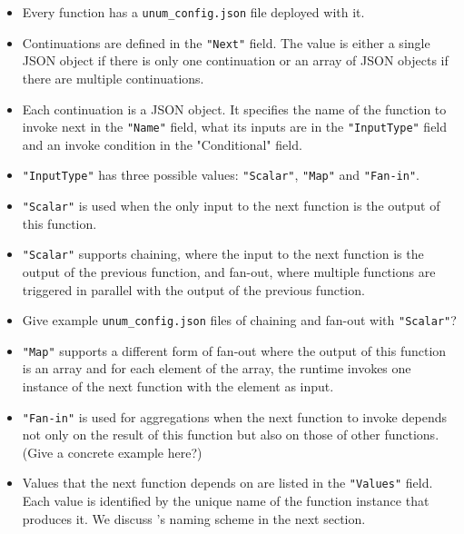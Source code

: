 \begin{itemize}

	\item Every function has a \texttt{unum\_config.json} file deployed with
	it.

	\item Continuations are defined in the \texttt{"Next"} field. The value is
	either a single JSON object if there is only one continuation or an array
	of JSON objects if there are multiple continuations.

	\item Each continuation is a JSON object. It specifies the name of the
	function to invoke next in the \texttt{"Name"} field, what its inputs are
	in the \texttt{"InputType"} field and an invoke condition in the
	"Conditional" field.

	\item \texttt{"InputType"} has three possible values: \texttt{"Scalar"},
	\texttt{"Map"} and \texttt{"Fan-in"}.

	\item \texttt{"Scalar"} is used when the only input to the next function
	is the output of this function.

	\item \texttt{"Scalar"} supports chaining, where the input to the next
	function is the output of the previous function, and fan-out, where
	multiple functions are triggered in parallel with the output of the
	previous function.

	\item Give example \texttt{unum\_config.json} files of chaining and
	fan-out with \texttt{"Scalar"}?

	\item \texttt{"Map"} supports a different form of fan-out where the output
	of this function is an array and for each element of the array, the
	runtime invokes one instance of the next function with the element as
	input.

	\item \texttt{"Fan-in"} is used for aggregations when the next function to
	invoke depends not only on the result of this function but also on those
	of other functions. (Give a concrete example here?)

	\item Values that the next function depends on are listed in the
	\texttt{"Values"} field. Each value is identified by the unique name of
	the function instance that produces it. We discuss \name{}'s naming scheme
	in the next section.


\end{itemize}
